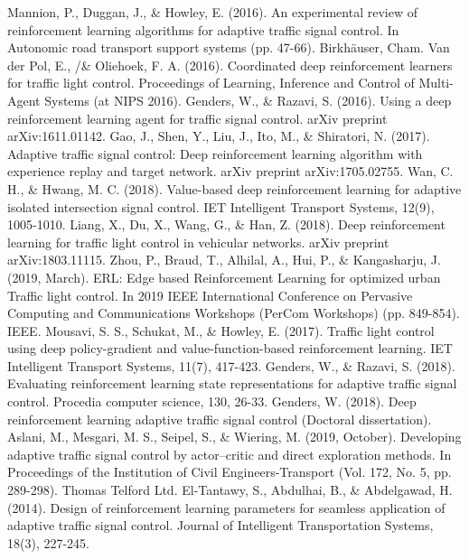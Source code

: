 \documentclass[conference]{IEEEtran}
\begin{document}
\begin{thebibliography}{00}
 Mannion, P., Duggan, J., \& Howley, E. (2016). An experimental review of reinforcement learning algorithms for adaptive traffic signal control. In Autonomic road transport support systems (pp. 47-66). Birkhäuser, Cham.
 Van der Pol, E., /\& Oliehoek, F. A. (2016). Coordinated deep reinforcement learners for traffic light control. Proceedings of Learning, Inference and Control of Multi-Agent Systems (at NIPS 2016).
 Genders, W., \& Razavi, S. (2016). Using a deep reinforcement learning agent for traffic signal control. arXiv preprint arXiv:1611.01142.
 Gao, J., Shen, Y., Liu, J., Ito, M., \& Shiratori, N. (2017). Adaptive traffic signal control: Deep reinforcement learning algorithm with experience replay and target network. arXiv preprint arXiv:1705.02755.
 Wan, C. H., \& Hwang, M. C. (2018). Value-based deep reinforcement learning for adaptive isolated intersection signal control. IET Intelligent Transport Systems, 12(9), 1005-1010.
 Liang, X., Du, X., Wang, G., \& Han, Z. (2018). Deep reinforcement learning for traffic light control in vehicular networks. arXiv preprint arXiv:1803.11115.
 Zhou, P., Braud, T., Alhilal, A., Hui, P., \& Kangasharju, J. (2019, March). ERL: Edge based Reinforcement Learning for optimized urban Traffic light control. In 2019 IEEE International Conference on Pervasive Computing and Communications Workshops (PerCom Workshops) (pp. 849-854). IEEE.
 Mousavi, S. S., Schukat, M., \& Howley, E. (2017). Traffic light control using deep policy-gradient and value-function-based reinforcement learning. IET Intelligent Transport Systems, 11(7), 417-423.
 Genders, W., \& Razavi, S. (2018). Evaluating reinforcement learning state representations for adaptive traffic signal control. Procedia computer science, 130, 26-33.
 Genders, W. (2018). Deep reinforcement learning adaptive traffic signal control (Doctoral dissertation).
 Aslani, M., Mesgari, M. S., Seipel, S., \& Wiering, M. (2019, October). Developing adaptive traffic signal control by actor–critic and direct exploration methods. In Proceedings of the Institution of Civil Engineers-Transport (Vol. 172, No. 5, pp. 289-298). Thomas Telford Ltd.
 El-Tantawy, S., Abdulhai, B., \& Abdelgawad, H. (2014). Design of reinforcement learning parameters for seamless application of adaptive traffic signal control. Journal of Intelligent Transportation Systems, 18(3), 227-245.

\end{thebibliography}
\end{document}
